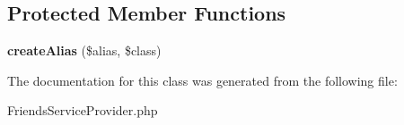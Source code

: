 \subsection*{Protected Member Functions}
\begin{DoxyCompactItemize}
\item 
\hypertarget{classDMA_1_1Friends_1_1FriendsServiceProvider_acad52dc5020c640afed3c4fe82243051}{{\bfseries create\-Alias} (\$alias, \$class)}\label{classDMA_1_1Friends_1_1FriendsServiceProvider_acad52dc5020c640afed3c4fe82243051}

\end{DoxyCompactItemize}


The documentation for this class was generated from the following file\-:\begin{DoxyCompactItemize}
\item 
Friends\-Service\-Provider.\-php\end{DoxyCompactItemize}

